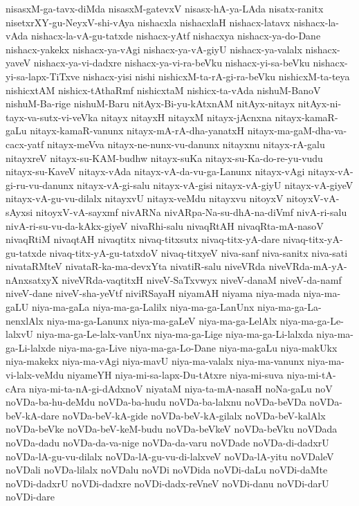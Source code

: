 {nisasxM-ga-tavx-diMda
nisasxM-gatevxV
nisasx-hA-ya-LAda
nisatx-ranitx
nisetxrXY-gu-NeyxV-shi-vAya
nishacxla
nishacxlaH
nishacx-latavx
nishacx-la-vAda
nishacx-la-vA-gu-tatxde
nishacx-yAtf
nishacxya
nishacx-ya-do-Dane
nishacx-yakekx
nishacx-ya-vAgi
nishacx-ya-vA-giyU
nishacx-ya-valalx
nishacx-yaveV
nishacx-ya-vi-dadxre
nishacx-ya-vi-ra-beVku
nishacx-yi-sa-beVku
nishacx-yi-sa-lapx-TiTxve
nishacx-yisi
nishi
nishicxM-ta-rA-gi-ra-beVku
nishicxM-ta-teya
nishicxtAM
nishicx-tAthaRmf
nishicxtaM
nishicx-ta-vAda
nishuM-BanoV
nishuM-Ba-rige
nishuM-Baru
nitAyx-Bi-yu-kAtxnAM
nitAyx-nitayx
nitAyx-ni-tayx-va-sutx-vi-veVka
nitayx
nitayxH
nitayxM
nitayx-jAcnxna
nitayx-kamaR-gaLu
nitayx-kamaR-vanunx
nitayx-mA-rA-dha-yanatxH
nitayx-ma-gaM-dha-va-cacx-yatf
nitayx-meVva
nitayx-ne-nunx-vu-danunx
nitayxnu
nitayx-rA-galu
nitayxreV
nitayx-su-KAM-budhw
nitayx-suKa
nitayx-su-Ka-do-re-yu-vudu
nitayx-su-KaveV
nitayx-vAda
nitayx-vA-da-vu-ga-Lanunx
nitayx-vAgi
nitayx-vA-gi-ru-vu-danunx
nitayx-vA-gi-salu
nitayx-vA-gisi
nitayx-vA-giyU
nitayx-vA-giyeV
nitayx-vA-gu-vu-dilalx
nitayxvU
nitayx-veMdu
nitayxvu
nitoyxV
nitoyxV-vA-sAyxsi
nitoyxV-vA-sayxmf
nivARNa
nivARpa-Na-su-dhA-na-diVmf
nivA-ri-salu
nivA-ri-su-vu-da-kAkx-giyeV
nivaRhi-salu
nivaqRtAH
nivaqRta-mA-nasoV
nivaqRtiM
nivaqtAH
nivaqtitx
nivaq-titxsutx
nivaq-titx-yA-dare
nivaq-titx-yA-gu-tatxde
nivaq-titx-yA-gu-tatxdoV
nivaq-titxyeV
niva-sanf
niva-sanitx
niva-sati
nivataRMteV
nivataR-ka-ma-devxYta
nivatiR-salu
niveVRda
niveVRda-mA-yA-nAnxsatxyX
niveVRda-vaqtitxH
niveV-SaTxvwyx
niveV-danaM
niveV-da-namf
niveV-dane
niveV-sha-yeVtf
niviRSayaH
niyamAH
niyama
niya-mada
niya-ma-gaLU
niya-ma-gaLa
niya-ma-ga-Lalilx
niya-ma-ga-LanUnx
niya-ma-ga-La-nenxlAlx
niya-ma-ga-Lanunx
niya-ma-gaLeV
niya-ma-ga-LelAlx
niya-ma-ga-Le-lalxvU
niya-ma-ga-Le-lalx-vanUnx
niya-ma-ga-Lige
niya-ma-ga-Li-lalxda
niya-ma-ga-Li-lalxde
niya-ma-ga-Live
niya-ma-ga-Lo-Dane
niya-ma-gaLu
niya-makUkx
niya-makekx
niya-ma-vAgi
niya-mavU
niya-ma-valalx
niya-ma-vanunx
niya-ma-vi-lalx-veMdu
niyameYH
niya-mi-sa-lapx-Du-tAtxre
niya-mi-suva
niya-mi-tA-cAra
niya-mi-ta-nA-gi-dAdxnoV
niyataM
niya-ta-mA-nasaH
noNa-gaLu
noV
noVDa-ba-hu-deMdu
noVDa-ba-hudu
noVDa-ba-lalxnu
noVDa-beVDa
noVDa-beV-kA-dare
noVDa-beV-kA-gide
noVDa-beV-kA-gilalx
noVDa-beV-kalAlx
noVDa-beVke
noVDa-beV-keM-budu
noVDa-beVkeV
noVDa-beVku
noVDada
noVDa-dadu
noVDa-da-va-nige
noVDa-da-varu
noVDade
noVDa-di-dadxrU
noVDa-lA-gu-vu-dilalx
noVDa-lA-gu-vu-di-lalxveV
noVDa-lA-yitu
noVDaleV
noVDali
noVDa-lilalx
noVDalu
noVDi
noVDida
noVDi-daLu
noVDi-daMte
noVDi-dadxrU
noVDi-dadxre
noVDi-dadx-reVneV
noVDi-danu
noVDi-darU
noVDi-dare
}
